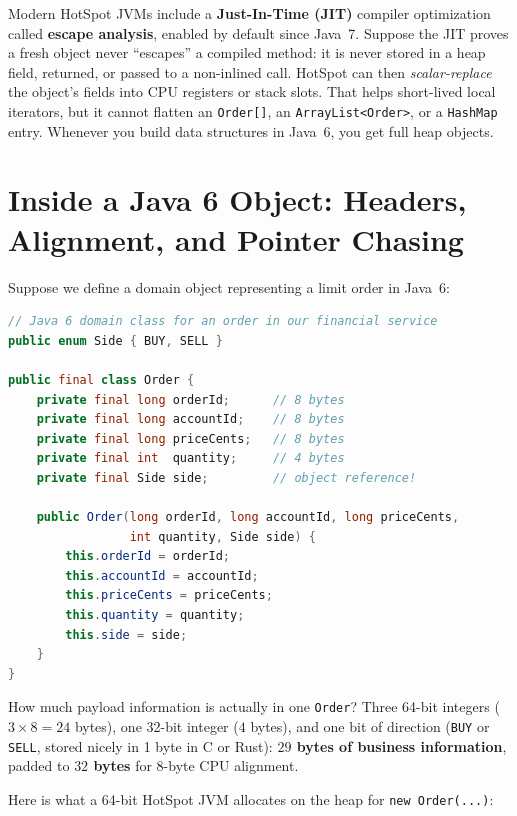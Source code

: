 \begin{marginnotebox}
Modern HotSpot JVMs include a \textbf{Just-In-Time (JIT)} compiler optimization called \textbf{escape analysis}, enabled by default since Java~7. Suppose the JIT proves a fresh object never ``escapes'' a compiled method: it is never stored in a heap field, returned, or passed to a non-inlined call. HotSpot can then \emph{scalar-replace} the object's fields into CPU registers or stack slots. That helps short-lived local iterators, but it cannot flatten an \texttt{Order[]}, an \texttt{ArrayList<Order>}, or a \texttt{HashMap} entry. Whenever you build data structures in Java~6, you get full heap objects.
\end{marginnotebox}

\section{Inside a Java 6 Object: Headers, Alignment, and Pointer Chasing}
\label{ch01:java-object-layout}

Suppose we define a domain object representing a limit order in Java~6:

\begin{lstlisting}[language=Java]
// Java 6 domain class for an order in our financial service
public enum Side { BUY, SELL }

public final class Order {
    private final long orderId;      // 8 bytes
    private final long accountId;    // 8 bytes
    private final long priceCents;   // 8 bytes
    private final int  quantity;     // 4 bytes
    private final Side side;         // object reference!

    public Order(long orderId, long accountId, long priceCents,
                 int quantity, Side side) {
        this.orderId = orderId;
        this.accountId = accountId;
        this.priceCents = priceCents;
        this.quantity = quantity;
        this.side = side;
    }
}
\end{lstlisting}

How much payload information is actually in one \texttt{Order}? Three 64-bit integers ($3 \times 8 = 24$ bytes), one 32-bit integer ($4$ bytes), and one bit of direction (\texttt{BUY} or \texttt{SELL}, stored nicely in 1 byte in C or Rust): \textbf{$29$ bytes of business information}, padded to \textbf{$32$ bytes} for 8-byte CPU alignment.

Here is what a 64-bit HotSpot JVM allocates on the heap for \texttt{new Order(...)}:


